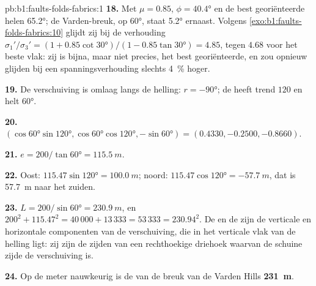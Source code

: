 \begin{solution}{pb:b1:faults-folds-fabrics:1}
\textbf{18.} Met $\mu = 0.85$, $\phi = \ang{40.4}$ en de best georiënteerde
 helen \ang{65.2}; de Varden-breuk, op \ang{60}, staat \ang{5.2} ernaast.
Volgens \cref{exo:b1:faults-folds-fabrics:10} glijdt zij bij de verhouding
$\sigma_1'/\sigma_3' = (1 + 0.85\cot\ang{30})/(1 - 0.85\tan\ang{30}) = 4.85$,
tegen $4.68$ voor het beste vlak: zij is bijna, maar niet precies, het best
georiënteerde, en zou opnieuw glijden bij een spanningsverhouding slechts \qty{4}{\percent}
hoger.

\textbf{19.} De verschuiving is omlaag langs de helling: $r = \ang{-90}$; de  heeft trend
$120$ en helt \ang{60}.

\textbf{20.} $(\cos\ang{60}\sin\ang{120}, \cos\ang{60}\cos\ang{120},
-\sin\ang{60}) = (0.4330, -0.2500, -0.8660)$.

\textbf{21.} $e = 200/\tan\ang{60} = \qty{115.5}{m}$.

\textbf{22.} Oost: $115.47\sin\ang{120} = \qty{100.0}{m}$; noord:
$115.47\cos\ang{120} = \qty{-57.7}{m}$, dat is \qty{57.7}{m} naar het zuiden.

\textbf{23.} $L = 200/\sin\ang{60} = \qty{230.9}{m}$, en
$200^2 + 115.47^2 = 40\,000 + 13\,333 = 53\,333 = 230.94^2$. De  en de
 zijn de verticale en horizontale componenten van de verschuiving, die in het verticale vlak van de helling ligt: zij zijn de zijden van een rechthoekige driehoek waarvan de schuine zijde de verschuiving is.

\textbf{24.} Op de meter nauwkeurig is de  van de breuk van de Varden Hills
\textbf{\qty[text-series-to-math=true]{231}{m}}.
\end{solution}
